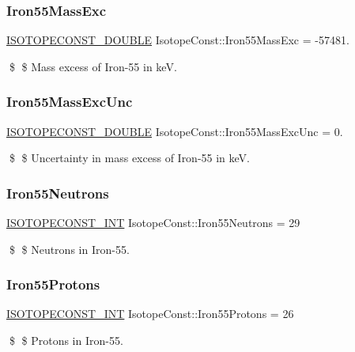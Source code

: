 \subsubsection{\texorpdfstring{Iron55\+Mass\+Exc}{Iron55MassExc}}
{\footnotesize\ttfamily \mbox{\hyperlink{group___isotope_const-_macros_ga8f45a7272ce02c0b4c65c44636ed719a}{I\+S\+O\+T\+O\+P\+E\+C\+O\+N\+S\+T\+\_\+\+D\+O\+U\+B\+LE}} Isotope\+Const\+::\+Iron55\+Mass\+Exc = -\/57481.}

\$ \$ Mass excess of Iron-\/55 in keV. \mbox{\label{group___isotope_const-_iron-_fe55_gaefb5be30fa4d617468512472652f021e}} 
\subsubsection{\texorpdfstring{Iron55\+Mass\+Exc\+Unc}{Iron55MassExcUnc}}
{\footnotesize\ttfamily \mbox{\hyperlink{group___isotope_const-_macros_ga8f45a7272ce02c0b4c65c44636ed719a}{I\+S\+O\+T\+O\+P\+E\+C\+O\+N\+S\+T\+\_\+\+D\+O\+U\+B\+LE}} Isotope\+Const\+::\+Iron55\+Mass\+Exc\+Unc = 0.}

\$ \$ Uncertainty in mass excess of Iron-\/55 in keV. \mbox{\label{group___isotope_const-_iron-_fe55_ga62a767f644de98a33d107ed0ce39e652}} 
\subsubsection{\texorpdfstring{Iron55\+Neutrons}{Iron55Neutrons}}
{\footnotesize\ttfamily \mbox{\hyperlink{group___isotope_const-_macros_ga5f18360b3e99483a35c32d789e62621c}{I\+S\+O\+T\+O\+P\+E\+C\+O\+N\+S\+T\+\_\+\+I\+NT}} Isotope\+Const\+::\+Iron55\+Neutrons = 29}

\$ \$ Neutrons in Iron-\/55. \mbox{\label{group___isotope_const-_iron-_fe55_ga2fe668658de40c86fcdc80fc2ec553cd}} 
\subsubsection{\texorpdfstring{Iron55\+Protons}{Iron55Protons}}
{\footnotesize\ttfamily \mbox{\hyperlink{group___isotope_const-_macros_ga5f18360b3e99483a35c32d789e62621c}{I\+S\+O\+T\+O\+P\+E\+C\+O\+N\+S\+T\+\_\+\+I\+NT}} Isotope\+Const\+::\+Iron55\+Protons = 26}

\$ \$ Protons in Iron-\/55. 